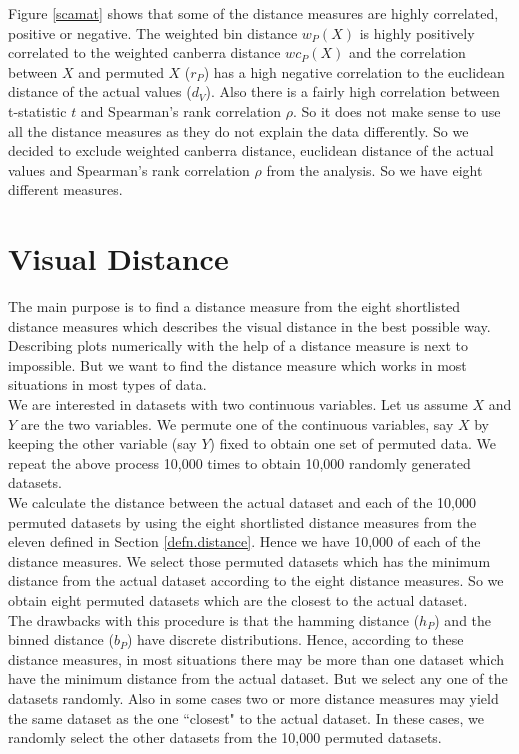 \documentclass[12]{report}
\begin{document}
Figure \ref{scamat} shows that some of the distance measures are highly correlated, positive or negative. The weighted bin distance $w_P(X)$ is highly positively correlated to the weighted canberra distance $wc_P(X)$ and the correlation between $X$ and permuted $X$ ($r_P$) has a high negative correlation to the euclidean distance of the actual values ($d_V$). Also there is a fairly high correlation between t-statistic $t$ and Spearman's rank correlation $\rho$.  So it does not make sense to use all the distance measures as they do not explain the data differently. So we decided to exclude weighted canberra distance, euclidean distance of the actual values and Spearman's rank correlation $\rho$ from the analysis. So we have eight different measures.

\section{Visual Distance}

The main purpose is to find a distance measure from the eight shortlisted distance measures which describes the visual distance in the best possible way. Describing plots numerically with the help of a distance measure is next to impossible. But we want to find the distance measure which works in most situations in most types of data. \\

We are interested in datasets with two continuous variables. Let us assume $X$ and $Y$ are the two variables.  We permute one of the continuous variables, say $X$ by keeping the other variable (say $Y$) fixed to obtain one set of permuted data. We repeat the above process 10,000 times to obtain 10,000 randomly generated datasets. \\

We calculate the distance between the actual dataset and each of the 10,000 permuted datasets by using the eight shortlisted distance measures from the eleven defined in Section \ref{defn.distance}. Hence we have 10,000 of each of the distance measures. We select those permuted datasets which has the minimum distance from the actual dataset according to the eight distance measures. So we obtain eight permuted datasets which are the closest to the actual dataset. \\

The drawbacks with this procedure is that the hamming distance ($h_P$)  and the binned distance ($b_P$) have discrete distributions. Hence, according to these distance measures, in most situations there may be more than one dataset which have the minimum distance from the actual dataset. But we select any one of the datasets randomly. Also in some cases two or more distance measures may yield the same dataset as the one ``closest" to the actual dataset. In these cases, we randomly select the other datasets from the 10,000 permuted datasets.   \\
\end{document}
